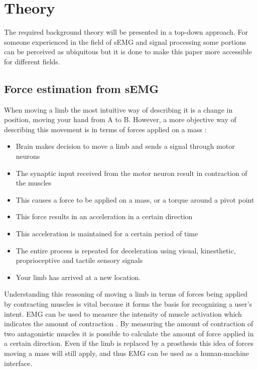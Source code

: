 \chapter{Theory}
The required background theory will be presented in a top-down approach. For someone experienced in the field of sEMG and signal processing some portions can be perceived as ubiquitous but it is done to make this paper more accessible for different fields.

\section{Force estimation from sEMG}
When moving a limb the most intuitive way of describing it is a change in position, moving your hand from A to B. However, a more objective way of describing this movement is in terms of forces applied on a mass \cite{human_physiology}\cite{human_anatomy_physiology}\cite{3d_printing_soft_semg}:
\begin{itemize}
    \item Brain makes decision to move a limb and sends a signal through motor neurons
    \item The synaptic input received from the motor neuron result in contraction of the muscles
    \item This causes a force to be applied on a mass, or a torque around a pivot point
    \item This force results in an acceleration in a certain direction
    \item This acceleration is maintained for a certain period of time
    \item The entire process is repeated for deceleration using visual, kinesthetic, proprioceptive and tactile sensory signals \cite{human_robotics}
    \item Your limb has arrived at a new location.
\end{itemize} 

Understanding this reasoning of moving a limb in terms of forces being applied by contracting muscles is vital because it forms the basis for recognizing a user's intent. EMG can be used to measure the intensity of muscle activation which indicates the amount of contraction \cite{human_robotics}. By measuring the amount of contraction of two antagonistic muscles it is possible to calculate the amount of force applied in a certain direction. Even if the limb is replaced by a prosthesis this idea of forces moving a mass will still apply, and thus EMG can be used as a human-machine interface.

